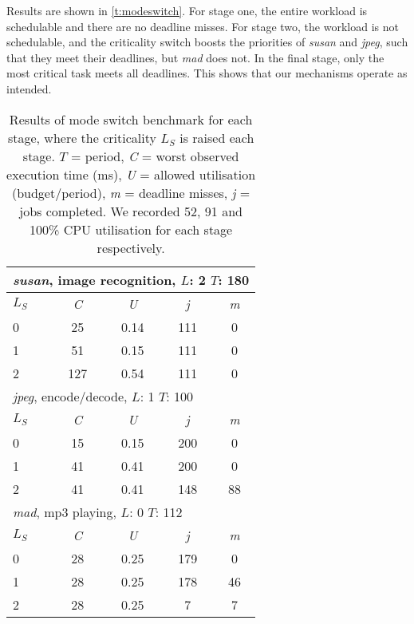 Results are shown in \autoref{t:modeswitch}. For stage one, the entire workload is schedulable and
there are no deadline misses. For stage two, the workload is not
schedulable, and the criticality switch boosts the priorities of
\textit{susan} and \textit{jpeg}, such that they meet
their deadlines, but
\textit{mad} does not. In the final stage, only the most critical task
meets all deadlines.
This shows that our mechanisms operate as intended.


\begin{table}[h]\centering
    \begin{tabular}{|l|c|c|c|c|}\hline
        \multicolumn{5}{|l|}{\textit{susan}, image recognition, \(L\): 2 \(T\): 180}\\\hline
        \textbf{\(L_S\)} & \textit{C} & \textit{U} & \textit{j} & \textit{m} \\\hline
                     0 & 25 & 0.14 & 111 & 0 \\\hline
                     1 & 51 & 0.15 & 111 & 0 \\\hline
                     2 & 127 & 0.54 & 111 & 0 \\\hline
        \multicolumn{5}{|l|}{\textit{jpeg}, encode/decode, \(L\): 1 \(T\): 100}\\\hline
        \textbf{\(L_S\)} & \textit{C} & \textit{U} & \textit{j} & \textit{m} \\\hline
                     0 & 15 & 0.15 & 200 & 0 \\\hline
                1 & 41 & 0.41 & 200 & 0 \\\hline
                     2 & 41 & 0.41 & 148 & 88 \\\hline
        \multicolumn{5}{|l|}{\textit{mad}, mp3 playing, \(L\): 0 \(T\): 112}\\\hline
        \textbf{\(L_S\)} & \textit{C} & \textit{U} & \textit{j} & \textit{m} \\\hline
                     0 & 28 & 0.25 & 179 & 0 \\\hline
                     1 & 28 & 0.25 & 178 & 46\\\hline
                     2 & 28 & 0.25 & 7 & 7 \\\hline
    \end{tabular}
    \caption{Results of mode switch benchmark for each
        stage, where the  criticality \(L_S\) is raised each stage. \(T\) =
        period, \textit{C} = worst observed execution time (ms),
      \textit{U} = allowed utilisation (budget/period),
    \textit{m} = deadline misses, \textit{j} = jobs completed. We recorded 52, 91 and 100\% CPU
utilisation for each stage respectively.}
    \label{t:modeswitch}
\end{table}


